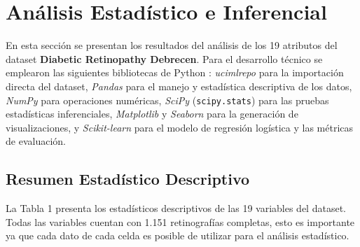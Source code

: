 \section{Análisis Estadístico e Inferencial}

En esta sección se presentan los resultados del análisis de los 19 atributos del dataset \textbf{Diabetic Retinopathy Debrecen}. Para el desarrollo técnico se emplearon las siguientes bibliotecas de Python \parencite{python2024}: \textit{ucimlrepo} \parencite{ucimlrepo2023} para la importación directa del dataset, \textit{Pandas} \parencite{reback2020pandas} para el manejo y estadística descriptiva de los datos, \textit{NumPy} \parencite{harris2020numpy} para operaciones numéricas, \textit{SciPy} (\texttt{scipy.stats}) \parencite{virtanen2020scipy} para las pruebas estadísticas inferenciales, \textit{Matplotlib} \parencite{hunter2007matplotlib} y \textit{Seaborn} \parencite{Waskom2021} para la generación de visualizaciones, y \textit{Scikit-learn} \parencite{pedregosa2011sklearn} para el modelo de regresión logística y las métricas de evaluación.

\subsection{Resumen Estadístico Descriptivo}

La Tabla 1 presenta los estadísticos descriptivos de las 19 variables del dataset. Todas las variables cuentan con 1.151 retinografías completas, esto es importante ya que cada dato de cada celda es posible de utilizar para el análisis estadístico. 

